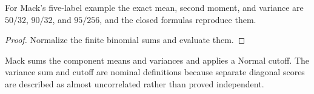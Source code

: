 \begin{theorem}\label{thm:mack1994-five}\leanok
{}
For Mack's five-label example the exact mean, second moment, and variance are
$50/32$, $90/32$, and $95/256$, and the closed formulas reproduce them.
\end{theorem}
\begin{proof}\leanok Normalize the finite binomial sums and evaluate them.
\end{proof}

\begin{definition}\label{def:mack1994-calendar-nominal}\leanok
Mack sums the component means and variances and applies a Normal cutoff. The
variance sum and cutoff are nominal definitions because separate diagonal
scores are described as almost uncorrelated rather than proved independent.
\end{definition}

